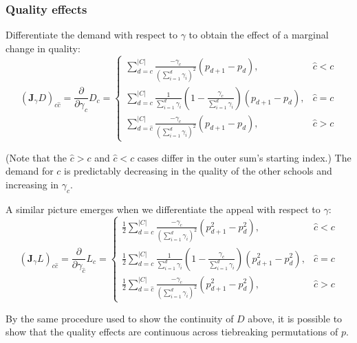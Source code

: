 \documentclass[12pt]{article}
\theoremstyle{definition}
\begin{document}
\subsubsection{Quality effects} \label{unconstrainedqualityeffects}
Differentiate the demand with respect to $\gamma$ to obtain the effect of a marginal change in quality:
\begin{equation} \label{jac-gamma-demand-uncons}
\left(\mathbf{J}_\gamma D \right)_{c\hat c} =
\frac{\partial}{\partial\gamma_{\hat c}} D_c = \begin{cases}
\sum_{d=c}^{|C|} \frac{-\gamma_c}{\left(\sum_{i=1}^{d} \gamma_i \right)^2} \left(p_{d+1} - p_d \right), & \hat c < c \\
\sum_{d=c}^{|C|} \frac{1}{\sum_{i=1}^{d} \gamma_i}
    \left( 1 - \frac{\gamma_c}{\sum_{i=1}^{d}\gamma_i }\right)
    \left(p_{d+1} - p_d \right), & \hat c = c\\
\sum_{d=\hat c}^{|C|} \frac{-\gamma_c}{\left(\sum_{i=1}^{d}\gamma_i \right)^2} \left(p_{d+1} - p_d \right), & \hat c > c
\end{cases}
\end{equation}

(Note that the $\hat c > c$ and $ \hat c < c$ cases differ in the outer sum's starting index.) The demand for $c$ is predictably decreasing in the quality of the other schools and increasing in $\gamma_c$.%

A similar picture emerges when we differentiate the appeal with respect to $\gamma$:
\begin{equation}
\left(\mathbf{J}_\gamma L \right)_{c\hat c} =
\frac{\partial}{\partial\gamma_{\hat c}} L_c = \begin{cases}
\frac{1}{2}\sum_{d=c}^{|C|} \frac{-\gamma_c}{\left(\sum_{i=1}^{d}\gamma_i \right)^2} \left(p_{d+1}^2 - p_d^2 \right), & \hat c < c \\
\frac{1}{2}\sum_{d=c}^{|C|} \frac{1}{\sum_{i=1}^{d} \gamma_i}
    \left( 1 - \frac{\gamma_c}{\sum_{i=1}^{d} \gamma_i}\right)
    \left(p_{d+1}^2 - p_d^2 \right), & \hat c = c\\
\frac{1}{2}\sum_{d=\hat c}^{|C|} \frac{-\gamma_c}{\left(\sum_{i=1}^{d} \gamma_i \right)^2} \left(p_{d+1}^2 - p_d^2 \right), & \hat c > c
\end{cases}\end{equation}

By the same procedure used to show the continuity of $D$ above, it is possible to show that the quality effects are continuous across tiebreaking permutations of $p$.
\end{document}
